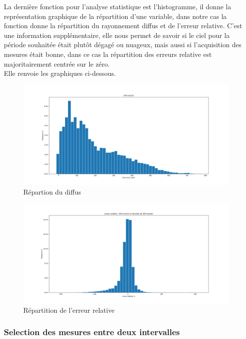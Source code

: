 \documentclass[12pt,a4paper]{article}
\begin{document}
\begin{flushleft}
La dernière fonction pour l'analyse statistique est l'histogramme, il donne la représentation graphique de la répartition d'une variable, dans notre cas la fonction donne la répartition du rayonnement diffus et de l'erreur relative. C'est une information supplémentaire, elle nous permet de savoir si le ciel pour la période souhaitée était plutôt dégagé ou nuageux, mais aussi si l'acquisition des mesures était bonne, dans ce cas la répartition des erreurs relative est majoritairement centrée sur le zéro.\\
Elle renvoie les graphiques ci-dessous.
\begin{figure}[H]
\centering
\includegraphics[width=15cm]{image/histogramme/1.png} 
\caption{Répartion du diffus}  
\end{figure}

\begin{figure}[H]
\centering
\includegraphics[width=15cm]{image/histogramme/2.png}  
\caption{Répartition de l'erreur relative}  
\end{figure}


\subsubsection{Selection des mesures entre deux intervalles}


\end{flushleft}
\end{document}
